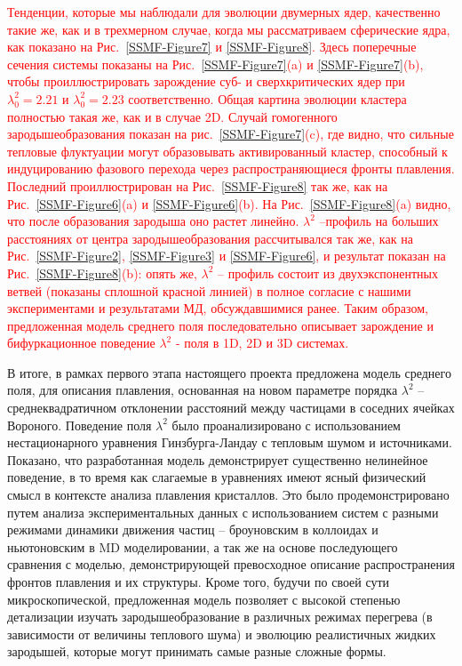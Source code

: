 \textcolor{red}{Тенденции, которые мы наблюдали для эволюции двумерных ядер, качественно такие же, как и в трехмерном случае, когда мы рассматриваем сферические ядра, как показано на Рис.~\ref{SSMF-Figure7} и \ref{SSMF-Figure8}. Здесь поперечные сечения системы показаны на Рис.~\ref{SSMF-Figure7}(a) и \ref{SSMF-Figure7}(b), чтобы проиллюстрировать зарождение суб- и сверхкритических ядер при $\lambda_0^2 = 2.21$ и $\lambda_0^2 = 2.23$ соответственно.
Общая картина эволюции кластера полностью такая же, как и в случае 2D. Случай гомогенного зародышеобразования показан на рис.~\ref{SSMF-Figure7}(c), где видно, что сильные тепловые флуктуации могут образовывать активированный кластер, способный к индуцированию фазового перехода через распространяющиеся фронты плавления. Последний проиллюстрирован на Рис.~\ref{SSMF-Figure8} так же, как на Рис.~\ref{SSMF-Figure6}(a) и \ref{SSMF-Figure6}(b).
На Рис.~\ref{SSMF-Figure8}(a) видно, что после образования зародыша оно растет линейно. $\lambda ^ 2$ --профиль на больших расстояниях от центра зародышеобразования рассчитывался так же, как на Рис.~\ref{SSMF-Figure2}, \ref{SSMF-Figure3} и \ref{SSMF-Figure6}, и результат показан на Рис.~\ref{SSMF-Figure8}(b): опять же, $\lambda ^ 2$ -- профиль состоит из двухэкспонентных ветвей (показаны сплошной красной линией) в полное согласие с нашими экспериментами и результатами МД, обсуждавшимися ранее. Таким образом, предложенная модель среднего поля последовательно описывает зарождение и бифуркационное поведение $\lambda ^ 2$ - поля в 1D, 2D и 3D системах.}


В итоге, в рамках первого этапа настоящего проекта предложена модель среднего поля, для описания  плавления, основанная на новом параметре порядка $\lambda^2$ -- среднеквадратичном отклонении расстояний между частицами в соседних ячейках Вороного.
Поведение поля $\lambda^2$ было проанализировано с использованием нестационарного уравнения Гинзбурга-Ландау с тепловым шумом и источниками.
Показано, что разработанная модель демонстрирует существенно нелинейное поведение, в то время как слагаемые в уравнениях имеют ясный физический смысл в контексте анализа плавления кристаллов.
Это было продемонстрировано путем анализа экспериментальных данных с использованием систем с разными режимами динамики движения частиц -- броуновским в коллоидах и ньютоновским в MD моделировании, а так же на основе последующего сравнения с моделью, демонстрирующей превосходное описание распространения фронтов плавления и их структуры.
Кроме того, будучи по своей сути микроскопической, предложенная модель позволяет с высокой степенью детализации изучать зародышеобразование в различных режимах перегрева (в зависимости от величины теплового шума) и эволюцию реалистичных жидких зародышей, которые могут принимать самые разные сложные формы.

